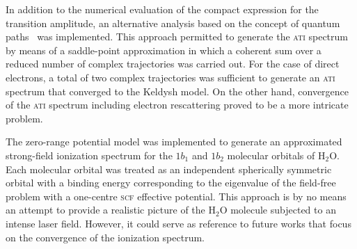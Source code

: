 In addition to the numerical evaluation of the compact expression for
the transition amplitude, an alternative analysis based on the concept
of quantum paths~\cite{KopoldOptComm2000} was implemented. This
approach permitted to generate the \textsc{ati} spectrum by means of a
saddle-point approximation in which a coherent sum over a reduced
number of complex trajectories was carried out. For the case of direct
electrons, a total of two complex trajectories was sufficient to
generate an \textsc{ati} spectrum that converged to the Keldysh
model. On the other hand, convergence of the \textsc{ati} spectrum
including electron rescattering proved to be a more intricate problem.


The zero-range potential model was implemented to generate an
approximated strong-field ionization spectrum for the $1b_{1}$ and
$1b_{2}$ molecular orbitals of H$_{2}$O. Each molecular orbital was
treated as an independent spherically symmetric orbital with a binding
energy corresponding to the eigenvalue of the field-free problem with
a one-centre \textsc{scf} effective potential. This approach is by no
means an attempt to provide a realistic picture of the H$_{2}$O
molecule subjected to an intense laser field. However, it could serve
as reference to future works that focus on the convergence of the
ionization spectrum.































































